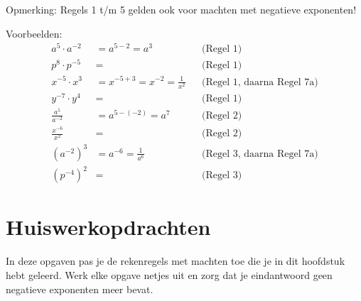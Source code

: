 Opmerking: Regels 1 t/m 5 gelden ook voor machten met negatieve exponenten!

Voorbeelden:
\begin{align*}
a^5 \cdot a^{-2}    &= a^{5-2} = a^3                     & &\text{(Regel 1)} \\[1em]
p^8 \cdot p^{-5}    &=                                   & &\text{(Regel 1)} \\[1em]
x^{-5} \cdot x^3    &= x^{-5+3} = x^{-2} = \frac{1}{x^2} & &\text{(Regel 1, daarna Regel 7a)} \\[1em]
y^{-7} \cdot y^4    &=                                   & &\text{(Regel 1)} \\[1em]
\frac{a^5}{a^{-2}}  &= a^{5-(-2)} = a^7                  & &\text{(Regel 2)} \\[1em]
\frac{x^{-6}}{x^2}  &=                                   & &\text{(Regel 2)} \\[1em]
(a^{-2})^3          &= a^{-6} = \frac{1}{a^6}            & &\text{(Regel 3, daarna Regel 7a)} \\[1em]
(p^{-4})^2          &=                                   & &\text{(Regel 3)}
\end{align*}

\newpage
\section{Huiswerkopdrachten}
In deze opgaven pas je de rekenregels met machten toe die je in dit hoofdstuk hebt geleerd. Werk elke opgave netjes uit en zorg dat je eindantwoord geen negatieve exponenten meer bevat.

